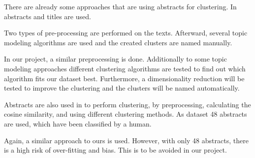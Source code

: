 There are already some approaches that are using abstracts for clustering.
In \cite{Clustering_scientific_documents_with_topic_modeling} abstracts and titles are used.

Two types of pre-processing are performed on the texts. 
Afterward, several topic modeling algorithms are used and the created clusters are named manually.

In our project, a similar preprocessing is done.
Additionally to some topic modeling approaches different clustering algorithms are tested to find out which algorithm fits our dataset best. 
Furthermore, a dimensionality reduction will be tested to improve the clustering and the clusters will be named automatically.

Abstracts are also used in \cite{An_Approach_to_Clustering_Abstracts} to perform clustering, by preprocessing, calculating the cosine similarity, and using different clustering methods.
As dataset 48 abstracts are used, which have been classified by a human.

Again, a similar approach to ours is used. However, with only 48 abstracts, there is a high risk of over-fitting and bias.
This is to be avoided in our project.